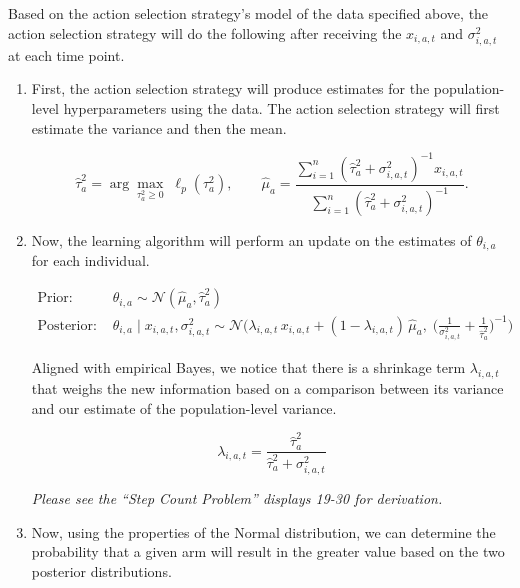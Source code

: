 \documentclass[letterpaper, 11pt]{extarticle}
\begin{document}
Based on the action selection strategy's model of the data specified above, the action selection strategy will do the following after receiving the $x_{i,a,t}$ and $\sigma^2_{i,a,t}$ at each time point.

\begin{enumerate}
    \item First, the action selection strategy will produce estimates for the population-level hyperparameters using the data. The action selection strategy will first estimate the variance and then the mean. 

    \[
    \hat{\tau}_a^{2} 
    = 
    \arg\max_{\tau_a^{2} \ge 0} \; \ell_{p}(\tau_a^{2}),
    \qquad
    \hat{\mu}_a
    =
    \frac{
        \displaystyle\sum_{i=1}^{n}
        \left( \hat{\tau}_a^{2} + \sigma^2_{i,a,t} \right)^{-1}
        x_{i,a,t}
    }{
        \displaystyle\sum_{i=1}^{n}
        \left( \hat{\tau}_a^{2} + \sigma^2_{i,a,t} \right)^{-1}
    }.
    \]

    \item Now, the learning algorithm will perform an update on the estimates of $\theta_{i,a}$ for each individual. 
    
    \begin{align*}
    \text{Prior: } 
    &\theta_{i,a} \sim \mathcal{N}(\hat{\mu}_a, \hat{\tau}_a^{2})\\
    \text{Posterior: } 
    &\theta_{i,a} \mid x_{i,a,t}, \sigma^2_{i,a,t}
    \sim
    \mathcal{N}\!\Bigg(
        \lambda_{i,a,t} \, x_{i,a,t}
        + (1 - \lambda_{i,a,t}) \, \hat{\mu}_a,
        \;
        \Bigg(
            \frac{1}{\sigma^2_{i,a,t}}
            +
            \frac{1}{\hat{\tau}_a^{2}}
        \Bigg)^{-1}
    \Bigg)
    \end{align*}

    Aligned with empirical Bayes, we notice that there is a shrinkage term $\lambda_{i,a,t}$ that weighs the new information based on a comparison between its variance and our estimate of the population-level variance.

    \[
    \lambda_{i,a,t}
    =
    \frac{\hat{\tau}_a^{2}}
    {\hat{\tau}_a^{2} + \sigma^2_{i,a,t}}
    \]

    \textit{Please see the \enquote{Step Count Problem} displays 19-30 for derivation.}

    \item Now, using the properties of the Normal distribution, we can determine the probability that a given arm will result in the greater value based on the two posterior distributions. 


\end{enumerate}
\end{document}
